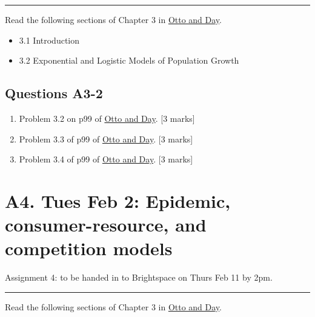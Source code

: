 \documentclass[]{book}
\providecommand{\tightlist}{%
  \setlength{\itemsep}{0pt}\setlength{\parskip}{0pt}}
\begin{document}
\begin{center}\rule{0.5\linewidth}{0.5pt}\end{center}

Read the following sections of Chapter 3 in
\href{https://ebookcentral-proquest-com.qe2a-proxy.mun.ca/lib/mun/reader.action?docID=768551\&ppg=66}{Otto
and Day}.

\begin{itemize}
\tightlist
\item
  3.1 Introduction
\item
  3.2 Exponential and Logistic Models of Population Growth
\end{itemize}

\section{Questions A3-2}\label{questions-a3-2}

\begin{enumerate}
\def\labelenumi{\arabic{enumi}.}
\setcounter{enumi}{3}
\item
  Problem 3.2 on p99 of
  \href{https://ebookcentral-proquest-com.qe2a-proxy.mun.ca/lib/mun/reader.action?docID=768551\&ppg=99}{Otto
  and Day}. {[}3 marks{]}
\item
  Problem 3.3 of p99 of
  \href{https://ebookcentral-proquest-com.qe2a-proxy.mun.ca/lib/mun/reader.action?docID=768551\&ppg=99}{Otto
  and Day}. {[}3 marks{]}
\item
  Problem 3.4 of p99 of
  \href{https://ebookcentral-proquest-com.qe2a-proxy.mun.ca/lib/mun/reader.action?docID=768551\&ppg=99}{Otto
  and Day}. {[}3 marks{]}
\end{enumerate}

\chapter{A4. Tues Feb 2: Epidemic, consumer-resource, and competition
models}\label{a4.-tues-feb-2-epidemic-consumer-resource-and-competition-models}

Assignment 4: to be handed in to Brightspace on Thurs Feb 11 by 2pm.

\begin{center}\rule{0.5\linewidth}{0.5pt}\end{center}

Read the following sections of Chapter 3 in
\href{https://ebookcentral-proquest-com.qe2a-proxy.mun.ca/lib/mun/reader.action?docID=768551\&ppg=87}{Otto
and Day}.
\end{document}
